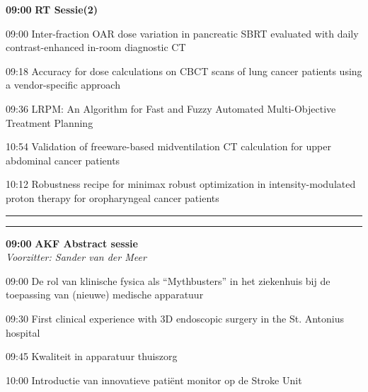 \documentclass[a4paper,10pt]{report}
\begin{document}
\begin{multicols*}{3}
\vfill

\begin{packed_enum}
\item[\textbf{09:00}]{\textbf{RT Sessie(2)}}
\item[09:00] Inter-fraction OAR dose variation in pancreatic SBRT eval\-uated with daily contrast-enhanced in-room diagnostic CT
\item[09:18] Accuracy for dose calculations on CBCT scans of lung cancer patients using a vendor-specific approach
\item[09:36] LRPM: An Algorithm for Fast and Fuzzy Automated Multi-Objective Treatment Planning
\item[10:54] Validation of freeware-based midventilation CT calculation for upper abdominal cancer patients
\item[10:12] Robustness recipe for minimax robust optimization in in\-ten\-sity-modulated proton therapy for oropharyngeal can\-cer patients
\end{packed_enum} %

\columnbreak

\hrule\vspace{2mm}
\vspace{2mm}\hrule\strut

\begin{packed_enum}
\item[\textbf{09:00}] \textbf{AKF Abstract sessie}\\\textit{Voorzitter: Sander van der Meer}
\item[09:00] De rol van klinische fysica als ``Mythbusters'' in het zieken\-huis bij de toe\-passing van (nieuwe) medische appara\-tuur
\item[09:30] First clinical experience with 3D endoscopic surgery in the St. Antonius hospital
\item[09:45] Kwaliteit in apparatuur thuiszorg
\item[10:00] Introductie van innovatieve patiënt monitor op de Stroke Unit
\end{packed_enum} %


\end{multicols*}
\end{document}
